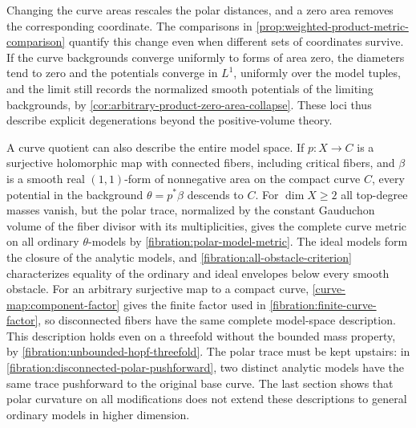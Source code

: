 Changing the curve areas rescales the polar distances, and a zero area removes the corresponding coordinate. The comparisons in \cref{prop:weighted-product-metric-comparison} quantify this change even when different sets of coordinates survive. If the curve backgrounds converge uniformly to forms of area zero, the diameters tend to zero and the potentials converge in $L^1$, uniformly over the model tuples, and the limit still records the normalized smooth potentials of the limiting backgrounds, by \cref{cor:arbitrary-product-zero-area-collapse}. These loci thus describe explicit degenerations beyond the positive-volume theory.

A curve quotient can also describe the entire model space. If $p\colon X\to C$ is a surjective holomorphic map with connected fibers, including critical fibers, and $\beta$ is a smooth real $(1,1)$-form of nonnegative area on the compact curve $C$, every potential in the background $\theta=p^*\beta$ descends to $C$. For $\dim X\geq2$ all top-degree masses vanish, but the polar trace, normalized by the constant Gauduchon volume of the fiber divisor with its multiplicities, gives the complete curve metric on all ordinary $\theta$-models by \cref{fibration:polar-model-metric}. The ideal models form the closure of the analytic models, and \cref{fibration:all-obstacle-criterion} characterizes equality of the ordinary and ideal envelopes below every smooth obstacle. For an arbitrary surjective map to a compact curve, \cref{curve-map:component-factor} gives the finite factor used in \cref{fibration:finite-curve-factor}, so disconnected fibers have the same complete model-space description. This description holds even on a threefold without the bounded mass property, by \cref{fibration:unbounded-hopf-threefold}. The polar trace must be kept upstairs: in \cref{fibration:disconnected-polar-pushforward}, two distinct analytic models have the same trace pushforward to the original base curve. The last section shows that polar curvature on all modifications does not extend these descriptions to general ordinary models in higher dimension.

